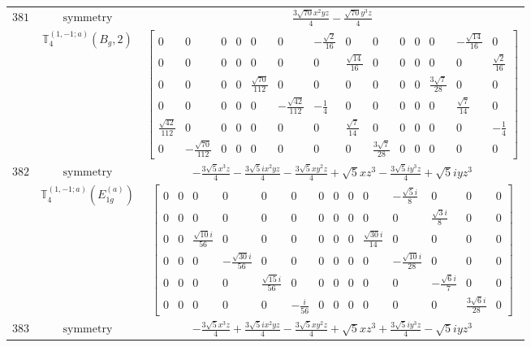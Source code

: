 \documentclass[fleqn,8pt,landscape]{jsarticle}
\begin{document}
\begin{longtable}{ccc}
$ 381 $ & $ \text{symmetry} $ & $ \frac{3 \sqrt{70} x^{2} y z}{4} - \frac{\sqrt{70} y^{3} z}{4} $ \\
$  $ & $ \mathbb{T}_{4}^{(1,-1;a)}(B_{g},2) $ & $ \begin{bmatrix} 0 & 0 & 0 & 0 & 0 & 0 & - \frac{\sqrt{2}}{16} & 0 & 0 & 0 & 0 & 0 & - \frac{\sqrt{14}}{16} & 0 \\ 0 & 0 & 0 & 0 & 0 & 0 & 0 & \frac{\sqrt{14}}{16} & 0 & 0 & 0 & 0 & 0 & \frac{\sqrt{2}}{16} \\ 0 & 0 & 0 & 0 & \frac{\sqrt{70}}{112} & 0 & 0 & 0 & 0 & 0 & 0 & \frac{3 \sqrt{7}}{28} & 0 & 0 \\ 0 & 0 & 0 & 0 & 0 & - \frac{\sqrt{42}}{112} & - \frac{1}{4} & 0 & 0 & 0 & 0 & 0 & \frac{\sqrt{7}}{14} & 0 \\ \frac{\sqrt{42}}{112} & 0 & 0 & 0 & 0 & 0 & 0 & \frac{\sqrt{7}}{14} & 0 & 0 & 0 & 0 & 0 & - \frac{1}{4} \\ 0 & - \frac{\sqrt{70}}{112} & 0 & 0 & 0 & 0 & 0 & 0 & \frac{3 \sqrt{7}}{28} & 0 & 0 & 0 & 0 & 0 \end{bmatrix} $ \\ \hline
$ 382 $ & $ \text{symmetry} $ & $ - \frac{3 \sqrt{5} x^{3} z}{4} - \frac{3 \sqrt{5} i x^{2} y z}{4} - \frac{3 \sqrt{5} x y^{2} z}{4} + \sqrt{5} x z^{3} - \frac{3 \sqrt{5} i y^{3} z}{4} + \sqrt{5} i y z^{3} $ \\
$  $ & $ \mathbb{T}_{4}^{(1,-1;a)}(E_{1g}^{(a)}) $ & $ \begin{bmatrix} 0 & 0 & 0 & 0 & 0 & 0 & 0 & 0 & 0 & 0 & - \frac{\sqrt{5} i}{8} & 0 & 0 & 0 \\ 0 & 0 & 0 & 0 & 0 & 0 & 0 & 0 & 0 & 0 & 0 & \frac{\sqrt{3} i}{8} & 0 & 0 \\ 0 & 0 & \frac{\sqrt{10} i}{56} & 0 & 0 & 0 & 0 & 0 & 0 & \frac{\sqrt{30} i}{14} & 0 & 0 & 0 & 0 \\ 0 & 0 & 0 & - \frac{\sqrt{30} i}{56} & 0 & 0 & 0 & 0 & 0 & 0 & - \frac{\sqrt{10} i}{28} & 0 & 0 & 0 \\ 0 & 0 & 0 & 0 & \frac{\sqrt{15} i}{56} & 0 & 0 & 0 & 0 & 0 & 0 & - \frac{\sqrt{6} i}{7} & 0 & 0 \\ 0 & 0 & 0 & 0 & 0 & - \frac{i}{56} & 0 & 0 & 0 & 0 & 0 & 0 & \frac{3 \sqrt{6} i}{28} & 0 \end{bmatrix} $ \\ \hline
$ 383 $ & $ \text{symmetry} $ & $ - \frac{3 \sqrt{5} x^{3} z}{4} + \frac{3 \sqrt{5} i x^{2} y z}{4} - \frac{3 \sqrt{5} x y^{2} z}{4} + \sqrt{5} x z^{3} + \frac{3 \sqrt{5} i y^{3} z}{4} - \sqrt{5} i y z^{3} $ \\

\end{longtable}
\end{document}

